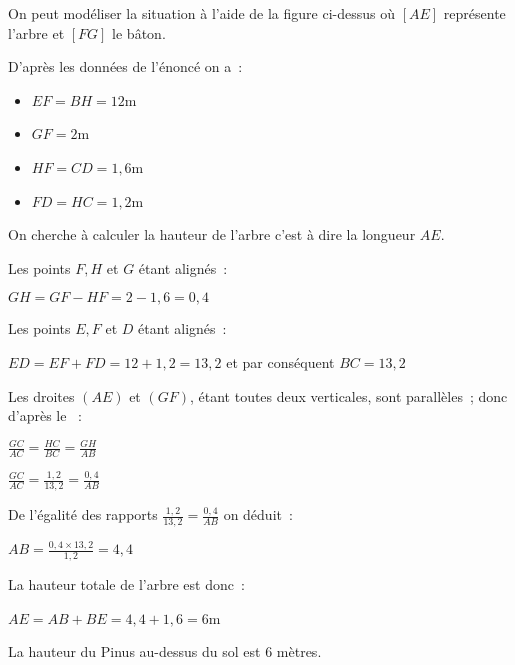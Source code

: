 \begin{corrige}
     \begin{center}
     \end{center}
     On peut modéliser la situation à l'aide de la figure ci-dessus où $\left[AE\right]$ représente l'arbre et $\left[FG\right]$ le bâton.
     \par
     D'après les données de l'énoncé on a~:
     \begin{itemize}
          \item $EF=BH=12$m
          \item $GF=2$m
          \item $HF=CD=1,6$m
          \item $FD=HC=1,2$m
     \end{itemize}
     On cherche à calculer la hauteur de l'arbre c'est à dire la longueur $AE$.
     \par
     Les points $F, H$ et $G$ étant alignés~:
     \par
     $GH=GF-HF=2-1,6=0,4$
     \par
     Les points $E, F$ et $D$ étant alignés~:
     \par
     $ED=EF+FD=12+1,2=13,2$ et par conséquent $BC=13,2$
     \par
     Les droites $\left(AE\right)$ et $\left(GF\right)$, étant toutes deux verticales, sont parallèles~; donc d'après le ~:
     \par
     $\frac{GC}{AC}=\frac{HC}{BC}=\frac{GH}{AB}$
     \par
     $\frac{GC}{AC}=\frac{1,2}{13,2}=\frac{0,4}{AB}$
     \par
     De l'égalité des rapports $\frac{1,2}{13,2}=\frac{0,4}{AB}$ on déduit~:
     \par
     $AB=\frac{0,4\times 13,2}{1,2}=4,4$
     \par
     La hauteur totale de l'arbre est donc~:
     \par
     $AE=AB+BE=4,4+1,6=6$m
     \par
     La hauteur du Pinus au-dessus du sol est $6$ mètres.
\end{corrige}
